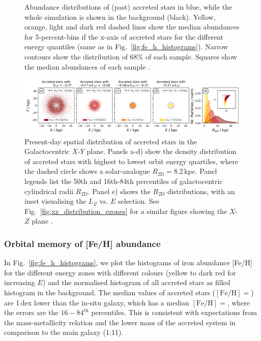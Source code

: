 \documentclass[fleqn,usenatbib]{mnras}
\begin{document}
\begin{figure}
        \caption{Abundance distributions of (past) accreted stars in blue, while the whole simulation is shown in the background (black). Yellow, orange, light and dark red dashed lines show the median abundances for 5-percent-bins if the x-axis of accreted stars for the different energy quantiles (same as in Fig.~\ref{fig:fe_h_histograms}). Narrow contours show the distribution of 68\% of each sample. Squares show the median abundances of each sample \href{https://github.com/svenbuder/golden_thread_I/tree/main/figures}{\faGithub}.}
    \label{fig:xfe_feh_zones}
\end{figure}

\begin{figure}
    \centering
    \includegraphics[width=\textwidth]{figures/xy_distribution_ezones.png}
    \caption{Present-day spatial distribution of accreted stars in the Galactocentric $X$-$Y$ plane. Panels a-d) show the density distribution of accreted stars with highest to lowest orbit energy quartiles, where the dashed circle shows a solar-analogue $R_\mathrm{2D}=8.2$\,kpc. Panel legends list the 50th and 16th-84th percentiles of galactocentric cylindrical radii $R_\mathrm{2D}$. Panel e) shows the $R_\mathrm{2D}$ distributions, with an inset visualising the $L_Z$ vs. $E$ selection. See Fig.~\ref{fig:xz_distribution_ezones} for a similar figure showing the $X$-$Z$ plane \href{https://github.com/svenbuder/golden_thread_I/tree/main/figures}{\faGithub}.}
    \label{fig:xy_distribution_ezones}
\end{figure}

\subsubsection{Orbital memory of {[Fe/H]} abundance}

In Fig.~\ref{fig:fe_h_histograms}, we plot the histograms of iron abundance [Fe/H] for the different energy zones with different colours (yellow to dark red for increasing $E$) and the normalised histogram of all accreted stars as filled histogram in the background. The median values of accreted stars ($\mathrm{[Fe/H]} = $) are 1\,dex lower than the in-situ galaxy, which has a median $\mathrm{[Fe/H]} = $, where the errors are the $16-84^\mathrm{th}$ percentiles. This is consistent with expectations from the mass-metallicity relation \citep[for example][]{Gallazzi2005, Kirby2013} and the lower mass of the accreted system in comparison to the main galaxy (1:11).
\end{document}
